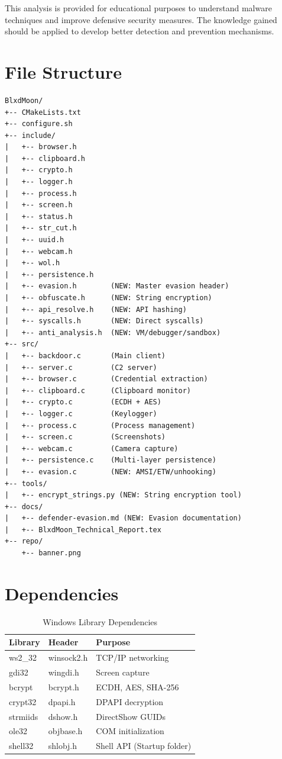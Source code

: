 \documentclass[12pt,a4paper]{article}
\begin{document}
\begin{infobox}
This analysis is provided for educational purposes to understand malware techniques and improve defensive security measures. The knowledge gained should be applied to develop better detection and prevention mechanisms.
\end{infobox}

\newpage
\appendix
\section{File Structure}

\begin{verbatim}
BlxdMoon/
+-- CMakeLists.txt
+-- configure.sh
+-- include/
|   +-- browser.h
|   +-- clipboard.h
|   +-- crypto.h
|   +-- logger.h
|   +-- process.h
|   +-- screen.h
|   +-- status.h
|   +-- str_cut.h
|   +-- uuid.h
|   +-- webcam.h
|   +-- wol.h
|   +-- persistence.h
|   +-- evasion.h        (NEW: Master evasion header)
|   +-- obfuscate.h      (NEW: String encryption)
|   +-- api_resolve.h    (NEW: API hashing)
|   +-- syscalls.h       (NEW: Direct syscalls)
|   +-- anti_analysis.h  (NEW: VM/debugger/sandbox)
+-- src/
|   +-- backdoor.c       (Main client)
|   +-- server.c         (C2 server)
|   +-- browser.c        (Credential extraction)
|   +-- clipboard.c      (Clipboard monitor)
|   +-- crypto.c         (ECDH + AES)
|   +-- logger.c         (Keylogger)
|   +-- process.c        (Process management)
|   +-- screen.c         (Screenshots)
|   +-- webcam.c         (Camera capture)
|   +-- persistence.c    (Multi-layer persistence)
|   +-- evasion.c        (NEW: AMSI/ETW/unhooking)
+-- tools/
|   +-- encrypt_strings.py (NEW: String encryption tool)
+-- docs/
|   +-- defender-evasion.md (NEW: Evasion documentation)
|   +-- BlxdMoon_Technical_Report.tex
+-- repo/
    +-- banner.png
\end{verbatim}

\section{Dependencies}

\begin{table}[H]
\centering
\begin{tabular}{llp{5cm}}
\toprule
\textbf{Library} & \textbf{Header} & \textbf{Purpose} \\
\midrule
ws2\_32 & winsock2.h & TCP/IP networking \\
gdi32 & wingdi.h & Screen capture \\
bcrypt & bcrypt.h & ECDH, AES, SHA-256 \\
crypt32 & dpapi.h & DPAPI decryption \\
strmiids & dshow.h & DirectShow GUIDs \\
ole32 & objbase.h & COM initialization \\
shell32 & shlobj.h & Shell API (Startup folder) \\
\bottomrule
\end{tabular}
\caption{Windows Library Dependencies}
\end{table}
\end{document}
